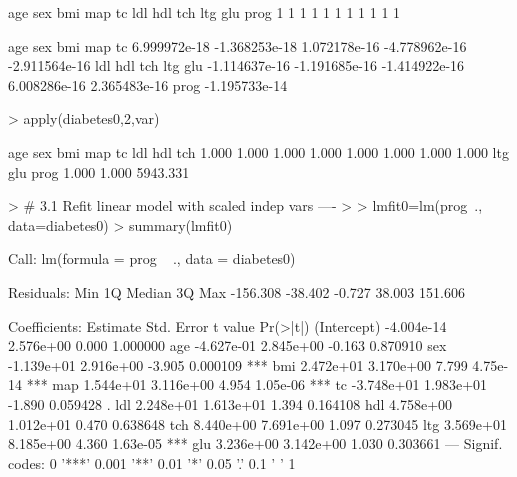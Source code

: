\documentclass{article}
\begin{document}
\begin{Schunk}
\begin{Sinput}
\end{Sinput}
\begin{Soutput}
 age  sex  bmi  map   tc  ldl  hdl  tch  ltg  glu prog 
   1    1    1    1    1    1    1    1    1    1    1 
\end{Soutput}
\begin{Soutput}
          age           sex           bmi           map            tc 
 6.999972e-18 -1.368253e-18  1.072178e-16 -4.778962e-16 -2.911564e-16 
          ldl           hdl           tch           ltg           glu 
-1.114637e-16 -1.191685e-16 -1.414922e-16  6.008286e-16  2.365483e-16 
         prog 
-1.195733e-14 
\end{Soutput}
\begin{Sinput}
> apply(diabetes0,2,var)
\end{Sinput}
\begin{Soutput}
     age      sex      bmi      map       tc      ldl      hdl      tch 
   1.000    1.000    1.000    1.000    1.000    1.000    1.000    1.000 
     ltg      glu     prog 
   1.000    1.000 5943.331 
\end{Soutput}
\begin{Sinput}
> # 3.1 Refit linear model with scaled indep vars ----
> 
> lmfit0=lm(prog~., data=diabetes0) 
> summary(lmfit0)
\end{Sinput}
\begin{Soutput}
Call:
lm(formula = prog ~ ., data = diabetes0)

Residuals:
     Min       1Q   Median       3Q      Max 
-156.308  -38.402   -0.727   38.003  151.606 

Coefficients:
              Estimate Std. Error t value Pr(>|t|)    
(Intercept) -4.004e-14  2.576e+00   0.000 1.000000    
age         -4.627e-01  2.845e+00  -0.163 0.870910    
sex         -1.139e+01  2.916e+00  -3.905 0.000109 ***
bmi          2.472e+01  3.170e+00   7.799 4.75e-14 ***
map          1.544e+01  3.116e+00   4.954 1.05e-06 ***
tc          -3.748e+01  1.983e+01  -1.890 0.059428 .  
ldl          2.248e+01  1.613e+01   1.394 0.164108    
hdl          4.758e+00  1.012e+01   0.470 0.638648    
tch          8.440e+00  7.691e+00   1.097 0.273045    
ltg          3.569e+01  8.185e+00   4.360 1.63e-05 ***
glu          3.236e+00  3.142e+00   1.030 0.303661    
---
Signif. codes:  0 '***' 0.001 '**' 0.01 '*' 0.05 '.' 0.1 ' ' 1


\end{Soutput}
\end{Schunk}
\end{document}
